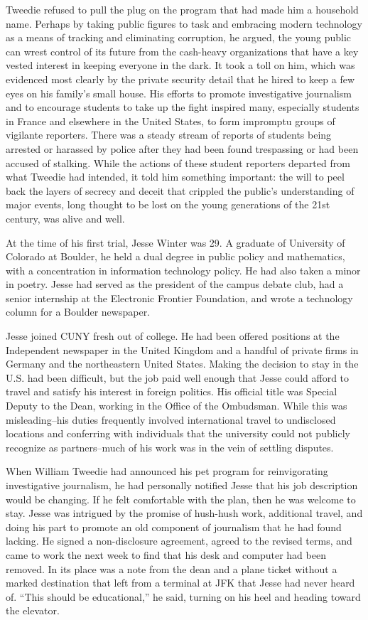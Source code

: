 \documentclass[12pt]{book}
\begin{document}
Tweedie refused to pull the plug on the program that had made him a household name.  Perhaps by taking public figures to task and embracing modern technology as a means of tracking and eliminating corruption, he argued, the young public can wrest control of its future from the cash-heavy organizations that have a key vested interest in keeping everyone in the dark.  It took a toll on him, which was evidenced most clearly by the private security detail that he hired to keep a few eyes on his family's small house.  His efforts to promote investigative journalism and to encourage students to take up the fight inspired many, especially students in France and elsewhere in the United States, to form impromptu groups of vigilante reporters.  There was a steady stream of reports of students being arrested or harassed by police after they had been found trespassing or had been accused of stalking.  While the actions of these student reporters departed from what Tweedie had intended, it told him something important: the will to peel back the layers of secrecy and deceit that crippled the public's understanding of major events, long thought to be lost on the young generations of the 21st century, was alive and well.

At the time of his first trial, Jesse Winter was 29.  A graduate of University of Colorado at Boulder, he held a dual degree in public policy and mathematics, with a concentration in information technology policy.  He had also taken a minor in poetry.  Jesse had served as the president of the campus debate club, had a senior internship at the Electronic Frontier Foundation, and wrote a technology column for a Boulder newspaper.

Jesse joined CUNY fresh out of college.  He had been offered positions at the Independent newspaper in the United Kingdom and a handful of private firms in Germany and the northeastern United States.  Making the decision to stay in the U.S. had been difficult, but the job paid well enough that Jesse could afford to travel and satisfy his interest in foreign politics.  His official title was Special Deputy to the Dean, working in the Office of the Ombudsman.  While this was misleading--his duties frequently involved international travel to undisclosed locations and conferring with individuals that the university could not publicly recognize as partners--much of his work was in the vein of settling disputes.

When William Tweedie had announced his pet program for reinvigorating investigative journalism, he had personally notified Jesse that his job description would be changing.  If he felt comfortable with the plan, then he was welcome to stay.  Jesse was intrigued by the promise of hush-hush work, additional travel, and doing his part to promote an old component of journalism that he had found lacking.  He signed a non-disclosure agreement, agreed to the revised terms, and came to work the next week to find that his desk and computer had been removed.  In its place was a note from the dean and a plane ticket without a marked destination that left from a terminal at JFK that Jesse had  never heard of.  ``This should be educational,'' he said, turning on his heel and heading toward the elevator.
\end{document}
